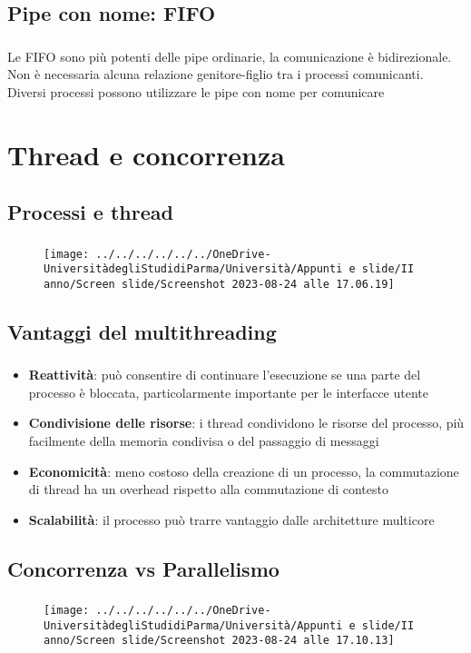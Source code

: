 \documentclass{beamer}
\newenvironment{mainframe}{
	\begin{frame}
		\frametitle{\insertsubsection}
		\framesubtitle{\insertsection}
	}{
	\end{frame}
}
\begin{document}
\subsection{Pipe con nome: FIFO}
\begin{mainframe}
	Le FIFO sono più potenti delle pipe ordinarie, la comunicazione è bidirezionale.\\
	Non è necessaria alcuna relazione genitore-figlio tra i processi comunicanti.\\
	Diversi processi possono utilizzare le pipe con nome per comunicare
\end{mainframe}
\section{Thread e concorrenza}
\subsection{Processi e thread}
\begin{mainframe}
	\begin{figure}
		\centering
		\texttt{[image: ../../../../../../OneDrive-UniversitàdegliStudidiParma/Università/Appunti e slide/II anno/Screen slide/Screenshot 2023-08-24 alle 17.06.19]}
	\end{figure}
\end{mainframe}
\subsection{Vantaggi del multithreading}
\begin{mainframe}
	\begin{itemize}
		\item \textbf{Reattività}: può consentire di continuare l'esecuzione se una parte del processo è bloccata, particolarmente importante per le interfacce utente
		\item \textbf{Condivisione delle risorse}: i thread condividono le risorse del processo, più facilmente della memoria condivisa o del passaggio di messaggi
		\item \textbf{Economicità}: meno costoso della creazione di un processo, la commutazione di thread ha un overhead rispetto alla commutazione di contesto
		\item \textbf{Scalabilità}: il processo può trarre vantaggio dalle architetture multicore
	\end{itemize}
\end{mainframe}
\subsection{Concorrenza vs Parallelismo}
\begin{mainframe}
	\begin{figure}
		\centering
		\texttt{[image: ../../../../../../OneDrive-UniversitàdegliStudidiParma/Università/Appunti e slide/II anno/Screen slide/Screenshot 2023-08-24 alle 17.10.13]}
	\end{figure}
\end{mainframe}
\end{document}
